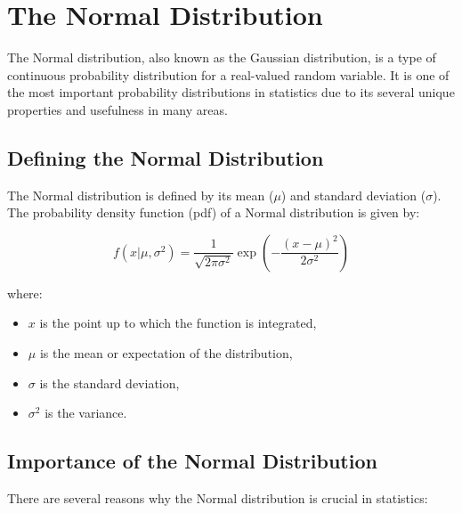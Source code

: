 \chapter{The Normal Distribution}

The Normal distribution, also known as the Gaussian distribution, is a
type of continuous probability distribution for a real-valued random
variable. It is one of the most important probability distributions in
statistics due to its several unique properties and usefulness in many
areas.

\section{Defining the Normal Distribution}

The Normal distribution is defined by its mean ($\mu$) and standard
deviation ($\sigma$). The probability density function (pdf) of a
Normal distribution is given by:

\begin{equation*}
f(x|\mu, \sigma^2) = \frac{1}{\sqrt{2\pi\sigma^2}} \exp\left(-\frac{(x-\mu)^2}{2\sigma^2}\right)
\end{equation*}

where:
\begin{itemize}
\item $x$ is the point up to which the function is integrated,
\item $\mu$ is the mean or expectation of the distribution,
\item $\sigma$ is the standard deviation,
\item $\sigma^2$ is the variance.
\end{itemize}

\section{Importance of the Normal Distribution}
There are several reasons why the Normal distribution is crucial in statistics:

